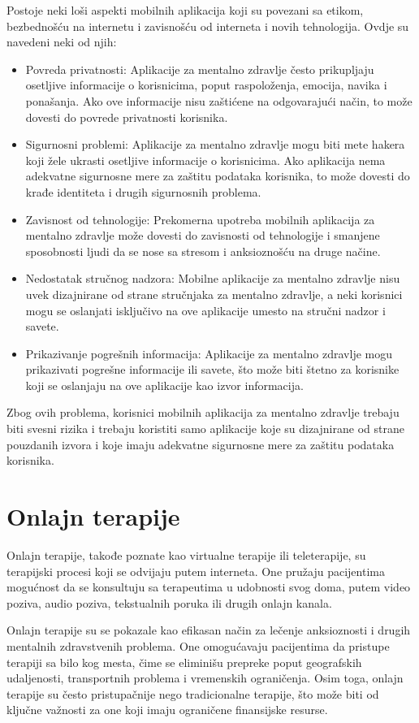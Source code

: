 \documentclass[a4paper]{article}
\begin{document}
Postoje neki loši aspekti mobilnih aplikacija koji su povezani sa etikom, bezbednošću na internetu i zavisnošću od interneta i novih tehnologija. Ovdje su navedeni neki od njih:
\begin{itemize}
\item Povreda privatnosti: Aplikacije za mentalno zdravlje često prikupljaju osetljive informacije o korisnicima, poput raspoloženja, emocija, navika i ponašanja. Ako ove informacije nisu zaštićene na odgovarajući način, to može dovesti do povrede privatnosti korisnika.
\item Sigurnosni problemi: Aplikacije za mentalno zdravlje mogu biti mete hakera koji žele ukrasti osetljive informacije o korisnicima. Ako aplikacija nema adekvatne sigurnosne mere za zaštitu podataka korisnika, to može dovesti do krađe identiteta i drugih sigurnosnih problema.
\item Zavisnost od tehnologije: Prekomerna upotreba mobilnih aplikacija za mentalno zdravlje može dovesti do zavisnosti od tehnologije i smanjene sposobnosti ljudi da se nose sa stresom i anksioznošću na druge načine.
\item Nedostatak stručnog nadzora: Mobilne aplikacije za mentalno zdravlje nisu uvek dizajnirane od strane stručnjaka za mentalno zdravlje, a neki korisnici mogu se oslanjati isključivo na ove aplikacije umesto na stručni nadzor i savete.
\item Prikazivanje pogrešnih informacija: Aplikacije za mentalno zdravlje mogu prikazivati pogrešne informacije ili savete, što može biti štetno za korisnike koji se oslanjaju na ove aplikacije kao izvor informacija.
\end{itemize}

Zbog ovih problema, korisnici mobilnih aplikacija za mentalno zdravlje trebaju biti svesni rizika i trebaju koristiti samo aplikacije koje su dizajnirane od strane pouzdanih izvora i koje imaju adekvatne sigurnosne mere za zaštitu podataka korisnika.

\section{Onlajn terapije}
\label{sec:onlajnTerapija}
Onlajn terapije, takođe poznate kao virtualne terapije ili teleterapije, su terapijski procesi koji se odvijaju putem interneta. One pružaju pacijentima mogućnost da se konsultuju sa terapeutima u udobnosti svog doma, putem video poziva, audio poziva, tekstualnih poruka ili drugih onlajn kanala.

Onlajn terapije su se pokazale kao efikasan način za lečenje anksioznosti i drugih mentalnih zdravstvenih problema. One omogućavaju pacijentima da pristupe terapiji sa bilo kog mesta, čime se eliminišu prepreke poput geografskih udaljenosti, transportnih problema i vremenskih ograničenja. Osim toga, onlajn terapije su često pristupačnije nego tradicionalne terapije, što može biti od ključne važnosti za one koji imaju ograničene finansijske resurse.
\end{document}

